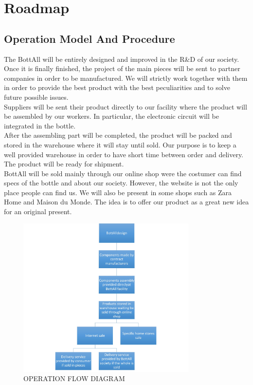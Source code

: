 \section{Roadmap}

\subsection{Operation Model And Procedure}
The BottAll will be entirely designed and improved in the R\&D of our society. Once it is finally finished, the project of the main pieces will be sent to partner companies in order to be manufactured. We will strictly work together with them in order to provide the best product with the best peculiarities and to solve future possible issues.\\
Suppliers will be sent their product directly to our facility where the product will be assembled by our workers. In particular, the electronic circuit will be integrated in the bottle.\\
After the assembling part will be completed, the product will be packed and stored in the warehouse where it will stay until sold. Our purpose is to keep a well provided warehouse in order to have short time between order and delivery. The product will be ready for shipment.\\
BottAll will be sold mainly through our online shop were the costumer can find specs of the bottle and about our society. However, the website is not the only place people can find us. We will also be present in some shops such as Zara Home and Maison du Monde. The idea is to offer our product as a great new idea for an original present.
\begin{figure}[H]
\centering
\includegraphics[width=0.8\textwidth]{images/flow_diagram.jpg}
\caption{OPERATION FLOW DIAGRAM}
\end{figure}

